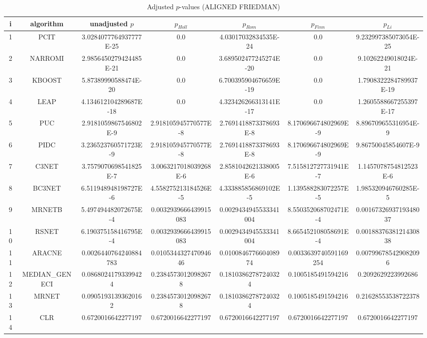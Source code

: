 \documentclass[a4paper,10pt]{article}
\begin{document}
\begin{landscape}
\begin{table}[!htp]
\centering\scriptsize
\caption{Adjusted $p$-values (ALIGNED FRIEDMAN)}
\begin{tabular}{ccccccc}
i&algorithm&unadjusted $p$&$p_{Holl}$&$p_{Rom}$&$p_{Finn}$&$p_{Li}$\\
\hline
1&PCIT&3.0284077764937777E-25&0.0&4.03017032834535E-24&0.0&9.232997385073054E-25\\
2&NARROMI&2.9856450279424485E-21&0.0&3.689502477245274E-20&0.0&9.10262249018024E-21\\
3&KBOOST&5.87389990588474E-20&0.0&6.700395904676659E-19&0.0&1.7908322284789937E-19\\
4&LEAP&4.134612104289687E-18&0.0&4.323426266313141E-17&0.0&1.2605588667255397E-17\\
5&PUC&2.9181059867546802E-9&2.918105945770577E-8&2.7691418873378693E-8&8.170696674802969E-9&8.896709655316954E-9\\
6&PIDC&3.236523760571723E-9&2.918105945770577E-8&2.7691418873378693E-8&8.170696674802969E-9&9.86750045854607E-9\\
7&C3NET&3.7579070698541825E-7&3.0063217018039268E-6&2.8581042621338005E-6&7.515812727731941E-7&1.1457078754812523E-6\\
8&BC3NET&6.511948948198727E-6&4.558275213184526E-5&4.333885856869102E-5&1.139588283072257E-5&1.985320946760285E-5\\
9&MRNETB&5.497494482072675E-4&0.0032939666439915083&0.0029434945533341004&8.550352068702471E-4&0.0016732693719348037\\
10&RSNET&6.190375158416795E-4&0.0032939666439915083&0.0029434945533341004&8.665452108058691E-4&0.0018837638121430838\\
11&ARACNE&0.0026440764240884783&0.010534432747094646&0.010084677660408974&0.0033639740591169254&0.007996785429082096\\
12&MEDIAN_GENECI&0.08680241793399424&0.23845730120982678&0.18103862787240324&0.1005185491594216&0.2092629223992686\\
13&MRNET&0.09051931393620162&0.23845730120982678&0.18103862787240324&0.1005185491594216&0.21628553538722378\\
14&CLR&0.6720016642277197&0.6720016642277197&0.6720016642277197&0.6720016642277197&0.6720016642277197\\
\hline
\end{tabular}
\end{table}


\newpage


\end{landscape}
\end{document}

